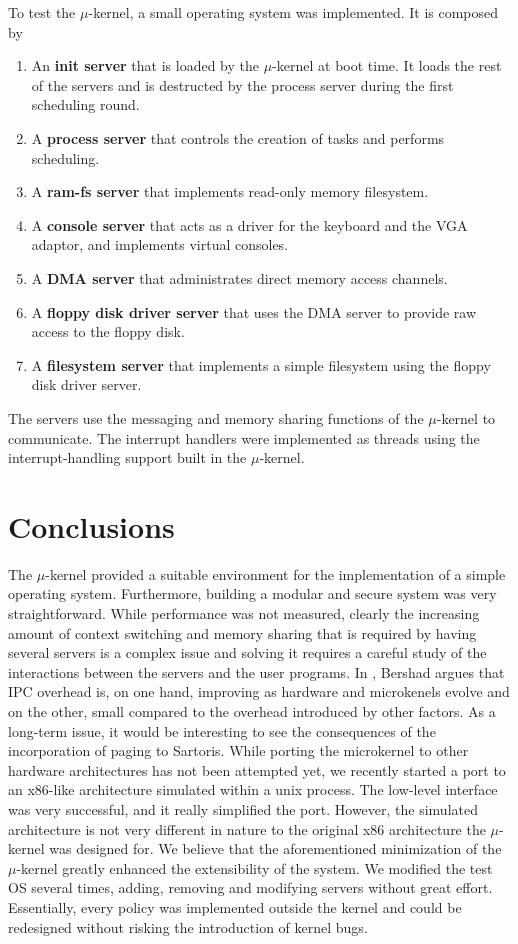 \documentclass[12pt, letterpaper, oneside, english]{article}
\begin{document}
To test the $\mu$-kernel, a small operating system was implemented. It is composed by 
\begin{enumerate}
\item[] An \textbf{init server} that is loaded by the $\mu$-kernel at boot time. It loads the rest of the servers and is destructed by the process server during the first scheduling round.
\item[] A \textbf{process server} that controls the creation of tasks and performs scheduling.
\item[] A \textbf{ram-fs server} that implements read-only memory filesystem.
\item[] A \textbf{console server} that acts as a driver for the keyboard and the VGA adaptor, and implements virtual consoles.
\item[] A \textbf{DMA server} that administrates direct memory access channels.
\item[] A \textbf{floppy disk driver server} that uses the DMA server to provide raw access to the floppy disk.
\item[] A \textbf{filesystem server} that implements a simple filesystem using the floppy disk driver server.
\end{enumerate}

The servers use the messaging and memory sharing functions of the $\mu$-kernel to communicate. The interrupt handlers were implemented as threads using the interrupt-handling support built in the $\mu$-kernel.

\section{Conclusions}

The $\mu$-kernel provided a suitable environment for the implementation of a simple operating system. Furthermore, building a modular and secure system was very straightforward. While performance was not measured, clearly the increasing amount of context switching and memory sharing that is required by having several servers is a complex issue and solving it requires a careful study of the interactions between the servers and the user programs. In \cite{IPC}, Bershad argues that IPC overhead is, on one hand, improving as hardware and microkenels evolve and on the other, small compared to the overhead introduced by other factors. As a long-term issue, it would be interesting to see the consequences of the incorporation of paging to Sartoris. While porting the microkernel to other hardware architectures has not been attempted yet, we recently started a port to an x86-like architecture simulated within a unix process. The low-level interface was very successful, and it really simplified the port. However, the simulated architecture is not very different in nature to the original x86 architecture the $\mu$-kernel was designed for. We believe that the aforementioned  minimization of the $\mu$-kernel greatly enhanced the extensibility of the system. We modified the test OS several times, adding, removing and modifying servers without great effort. Essentially, every policy was implemented outside the kernel and could be redesigned without risking the introduction of kernel bugs.
\end{document}
